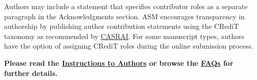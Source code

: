 \documentclass[lineno]{asm-article}
\begin{document}
Authors may include a statement that specifies contributor roles as a separate paragraph in the Acknowledgments section. ASM encourages transparency in authorship by publishing author contribution statements using the CRediT taxonomy as recommended by \href{https://casrai.org/credit/}{CASRAI}. For some manuscript types, authors have the option of assigning CRediT roles during the online submission process.

\textbf{Please read the \href{https://journals.asm.org/journal/msystems/submission-review-process}{Instructions to Authors} or browse the \href{https://journals.asm.org/journal/msystems/faq}{FAQs} for further details.}

\nocite{*}

\end{document}
